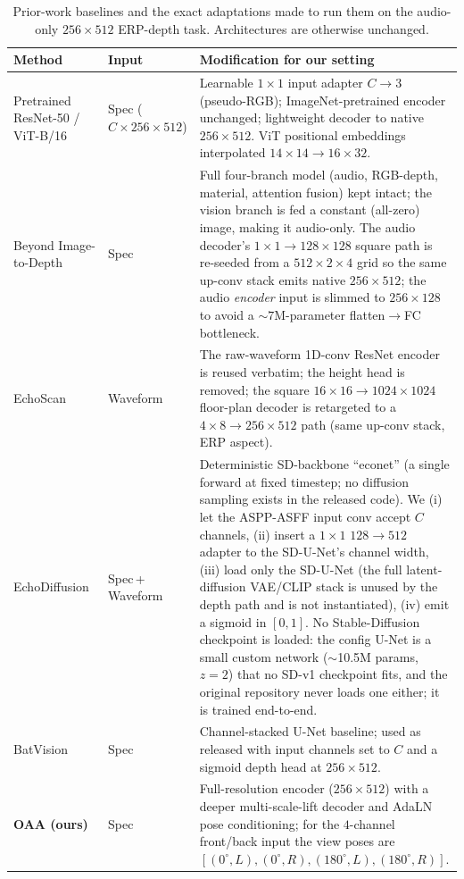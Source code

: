 \begin{table}[t]
\centering
\small
\setlength{\tabcolsep}{5pt}
\begin{tabular}{@{}p{2.3cm}p{2.1cm}p{7.5cm}@{}}
\toprule
\textbf{Method} & \textbf{Input} & \textbf{Modification for our setting} \\
\midrule
Pretrained ResNet-50 / ViT-B/16 & Spec ($C{\times}256{\times}512$) &
Learnable $1{\times}1$ input adapter $C\!\to\!3$ (pseudo-RGB); ImageNet-pretrained
encoder unchanged; lightweight decoder to native $256\times512$. ViT positional
embeddings interpolated $14{\times}14\!\to\!16{\times}32$. \\
\addlinespace
Beyond Image-to-Depth~\cite{parida2021beyond} & Spec &
Full four-branch model (audio, RGB-depth, material, attention fusion) kept intact;
the vision branch is fed a constant (all-zero) image, making it audio-only. The
audio decoder's $1{\times}1{\to}128{\times}128$ square path is re-seeded from a
$512{\times}2{\times}4$ grid so the same up-conv stack emits native $256\times512$;
the audio \emph{encoder} input is slimmed to $256{\times}128$ to avoid a
${\sim}7$M-parameter flatten$\to$FC bottleneck. \\
\addlinespace
EchoScan~\cite{yeon2024echoscan} & Waveform &
The raw-waveform 1D-conv ResNet encoder is reused verbatim; the height head is
removed; the square $16{\times}16{\to}1024{\times}1024$ floor-plan decoder is
retargeted to a $4{\times}8{\to}256{\times}512$ path (same up-conv stack, ERP
aspect). \\
\addlinespace
EchoDiffusion~\cite{zhang2024echodiffusion} & Spec\,+\,Waveform &
Deterministic SD-backbone ``econet'' (a single forward at fixed timestep; no
diffusion sampling exists in the released code). We (i) let the ASPP-ASFF input
conv accept $C$ channels, (ii) insert a $1{\times}1$ $128{\to}512$ adapter to the
SD-U-Net's channel width, (iii) load only the SD-U-Net (the full latent-diffusion
VAE/CLIP stack is unused by the depth path and is not instantiated), (iv) emit a
sigmoid in $[0,1]$. No Stable-Diffusion checkpoint is loaded: the config U-Net is a
small custom network ($\sim$10.5M params, $z\!=\!2$) that no SD-v1 checkpoint fits,
and the original repository never loads one either; it is trained end-to-end. \\
\addlinespace
BatVision~\cite{brunetto2023batvision} & Spec &
Channel-stacked U-Net baseline; used as released with input channels set to $C$ and
a sigmoid depth head at $256\times512$. \\
\midrule
\textbf{OAA (ours)} & Spec &
Full-resolution encoder ($256\times512$) with a deeper multi-scale-lift decoder and
AdaLN pose conditioning; for the $4$-channel front/back input the view poses are
$[(0^\circ,L),(0^\circ,R),(180^\circ,L),(180^\circ,R)]$. \\
\bottomrule
\end{tabular}
\caption{Prior-work baselines and the exact adaptations made to run them on the
audio-only $256\times512$ ERP-depth task. Architectures are otherwise unchanged.}
\label{tab:baseline-mods}
\end{table}

